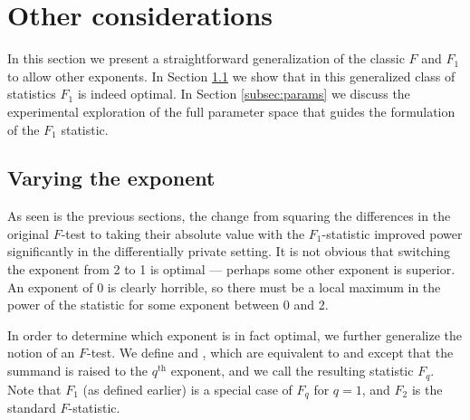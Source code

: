 
\section{Other considerations}
\label{sec:considerations}

In this section we present a straightforward generalization of the classic $F$ and $F_1$ to allow other exponents. In Section \ref{subsec:fq} we show that in this generalized class of statistics $F_1$ is indeed optimal. In Section \ref{subsec:params} we discuss the experimental exploration of the full parameter space that guides the formulation of the $F_1$ statistic.

\subsection{Varying the exponent}\label{subsec:fq}
As seen is the previous sections, the change from squaring the differences in the original $F$-test to taking their absolute value with the $F_1$-statistic improved power significantly in the differentially private setting. It is not obvious that switching the exponent from 2 to 1 is optimal --- perhaps some other exponent is superior. An exponent of 0 is clearly horrible, so there must be a local maximum in the power of the statistic for some exponent between 0 and 2.

In order to determine which exponent is in fact optimal, we further generalize the notion of an $F$-test.  We define \sqa and \sqe, which are equivalent to \ssa and \sse except that the summand is raised to the $q^{\text{th}}$ exponent, and we call the resulting statistic $F_q$.  Note that $F_1$ (as defined earlier) is a special case of $F_q$ for $q=1$, and $F_2$ is the standard $F$-statistic.

